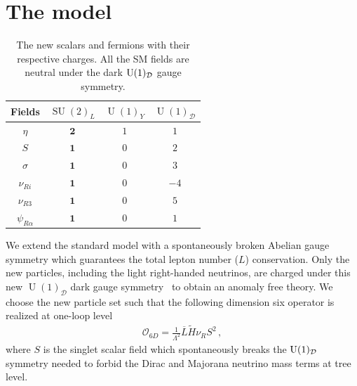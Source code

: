 \documentclass[12pt]{article}
\begin{document}
\section{The model}
\label{sec:Model}
%
\begin{table}[t!]
  \centering
  \begin{tabular}{|c|c|c|c|}
    \hline  
    Fields     & $\operatorname{SU}(2)_L$ & $\operatorname{U}(1)_Y $ & $\operatorname{U}(1)_{\mathcal{D}}$ \\ \hline
    $\eta$  & $\boldsymbol{2}$ & $1$  & $1$ \\
    $S$ & $\boldsymbol{1}$ & $0$  & $2$ \\
    $\sigma$ & $\boldsymbol{1}$ & $0$ & $3$ \\
    \hline
    $\nu_{Ri}$ & $\boldsymbol{1}$ & $0$ & $-4$\\
    $\nu_{R3}$ & $\boldsymbol{1}$ & $0$ & $5$\\
    $\psi_{R\alpha}$  & $\boldsymbol{1}$ & 0 & $1$ \\\hline
  \end{tabular}
  \caption{The new scalars and fermions with their respective charges. All the SM fields are neutral under the dark $\operatorname{U}(1)_{\cal {D}}$ gauge symmetry. }
    \label{tab:partcont}
\end{table}
%
We extend the standard model with a spontaneously broken Abelian gauge
symmetry which guarantees the total lepton number ($L$)
conservation. Only the new particles, including the light right-handed
neutrinos, are charged under this new
$\operatorname{U}(1)_{\mathcal{D}}$ dark gauge
symmetry~\cite{Campos:2017dgc,Bertuzzo:2018itn,Bertuzzo:2018ftf} to obtain an anomaly free theory. We
choose the new particle set such that the following dimension six
operator is realized at one-loop level
\begin{align}
  \label{eq:ld6}
  \mathcal{O}_{6D}=\frac{1}{\Lambda^2} \overline{L} \tilde{H} \nu_R S^2\,,
\end{align}
where $S$ is the singlet scalar field which spontaneously breaks the $\operatorname{U}(1)_{\cal {D}}$ symmetry needed to forbid the Dirac and Majorana neutrino mass terms at tree level.
\end{document}
